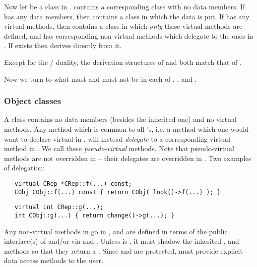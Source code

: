 Now let  be a class in .  contains a
corresponding class  with no data members.  If  has
any data members, then  contains a class  in
which the data is put.  If  has any virtual methods, then
 contains a class  in which {\em only} these
virtual methods are defined, and  has corresponding
non-virtual methods which delegate to the ones in . If
 exists then  derives directly from it.

Except for the / duality, the derivation structures of
 and  both match that of .

Now we turn to what must and must not be in each of ,
, and .

\subsubsection{Object classes}

A class  contains no data members (besides the inherited
one) and no virtual methods. Any method which is common to all 's, i.e. a method which one would want to declare virtual in , will instead {\em delegate} to a corresponding virtual method
in . We call these {\em pseudo-virtual} methods. Note that
pseudo-virtual methods are not overridden in  -- their
delegates are overridden in . Two examples of delegation:

\lskip
\begin{verbatim}
   virtual CRep *CRep::f(...) const;
   CObj CObj::f(...) const { return CObj( look()->f(...) ); }
\end{verbatim}
\lskip
\begin{verbatim}
   virtual int CRep::g(...);
   int CObj::g(...) { return change()->g(...); }
\end{verbatim}
\lskip

Any non-virtual methods in  go in , and are defined
in terms of the public interface(s) of  and/or 
via  and . Unless  is , it must shadow the inherited , 
and  methods so that they return a .
Since  and  are protected, 
must provide explicit data access methods to the user.

